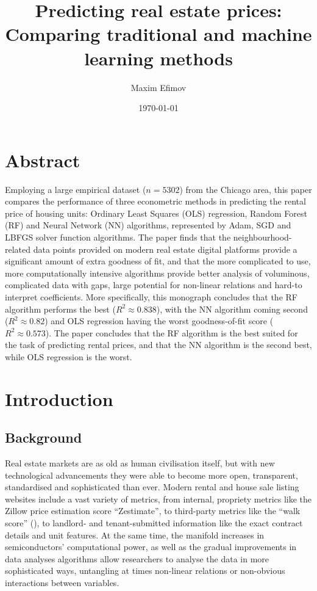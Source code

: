 \documentclass[12pt]{report}
\title{Predicting real estate prices: Comparing traditional and machine learning methods}
\author{Maxim Efimov}
\date{\today}
\begin{document}
\maketitle
\tableofcontents
\newpage
{} %
\fontsize{12}{18}\selectfont %
\renewcommand{\footnotesize}{\fontsize{10}{12}\selectfont} %

\newpage

\section*{Abstract}
Employing a large empirical dataset ($n=5302$) from the Chicago area, this paper compares the performance of three econometric methods in predicting the rental price of housing units: Ordinary Least Squares (OLS) regression, Random Forest (RF) and Neural Network (NN) algorithms, represented by Adam, SGD and LBFGS solver function algorithms. The paper finds that the neighbourhood-related data points provided on modern real estate digital platforms provide a significant amount of extra goodness of fit, and that the more complicated to use, more computationally intensive algorithms provide better analysis of voluminous, complicated data with gaps, large potential for non-linear relations and hard-to interpret coefficients. More specifically, this monograph concludes that the RF algorithm performs the best ($R^2\approx 0.838$), with the NN algorithm coming second ($R^2\approx 0.82$) and OLS regression having the worst goodness-of-fit score ($R^2\approx 0.573$). The paper concludes that the RF algorithm is the best suited for the task of predicting rental prices, and that the NN algorithm is the second best, while OLS regression is the worst.


\section{Introduction}
\subsection{Background}

Real estate markets are as old as human civilisation itself, but with new technological advancements they were able to become more open, transparent, standardised and sophisticated than ever. Modern rental and house sale listing websites include a vast variety of metrics, from internal, propriety metrics like the Zillow price estimation score “Zestimate”, to third-party metrics like the “walk score” (\cite{WalkScore2024}), to landlord- and tenant-submitted information like the exact contract details and unit features. At the same time, the manifold increases in semiconductors’ computational power, as well as the gradual improvements in data analyses algorithms allow researchers to analyse the data in more sophisticated ways, untangling at times non-linear relations or non-obvious interactions between variables.
\end{document}
